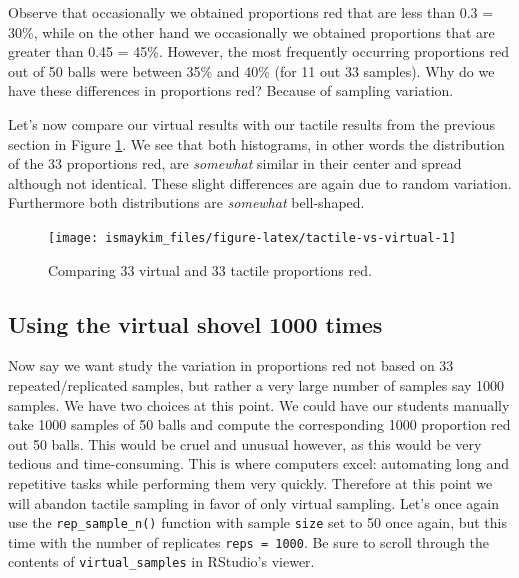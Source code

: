 \documentclass[12pt, krantz2,]{krantz}
\begin{document}
Observe that occasionally we obtained proportions red that are less than 0.3 = 30\%, while on the other hand we occasionally we obtained proportions that are greater than 0.45 = 45\%. However, the most frequently occurring proportions red out of 50 balls were between 35\% and 40\% (for 11 out 33 samples). Why do we have these differences in proportions red? Because of sampling variation.

Let's now compare our virtual results with our tactile results from the previous section in Figure \ref{fig:tactile-vs-virtual}. We see that both histograms, in other words the distribution of the 33 proportions red, are \emph{somewhat} similar in their center and spread although not identical. These slight differences are again due to random variation. Furthermore both distributions are \emph{somewhat} bell-shaped.

\begin{figure}

{\centering \texttt{[image: ismaykim\_files/figure-latex/tactile-vs-virtual-1]} 

}

\caption{Comparing 33 virtual and 33 tactile proportions red.}\label{fig:tactile-vs-virtual}
\end{figure}

\hypertarget{using-the-virtual-shovel-1000-times}{%
\subsection{Using the virtual shovel 1000 times}\label{using-the-virtual-shovel-1000-times}}

Now say we want study the variation in proportions red not based on 33 repeated/replicated samples, but rather a very large number of samples say 1000 samples. We have two choices at this point. We could have our students manually take 1000 samples of 50 balls and compute the corresponding 1000 proportion red out 50 balls. This would be cruel and unusual however, as this would be very tedious and time-consuming. This is where computers excel: automating long and repetitive tasks while performing them very quickly. Therefore at this point we will abandon tactile sampling in favor of only virtual sampling. Let's once again use the \texttt{rep\_sample\_n()} function with sample \texttt{size} set to 50 once again, but this time with the number of replicates \texttt{reps\ =\ 1000}. Be sure to scroll through the contents of \texttt{virtual\_samples} in RStudio's viewer.
\end{document}
